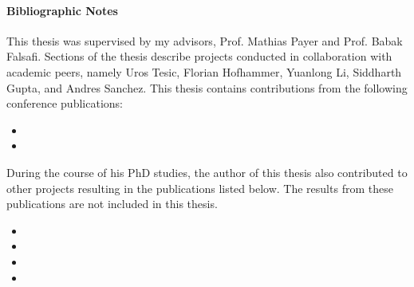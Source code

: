 \paragraph{Bibliographic Notes}
This thesis was supervised by my advisors, Prof. Mathias Payer and Prof. Babak Falsafi.
Sections of the thesis describe projects conducted in collaboration with academic peers, 
namely Uros Tesic, Florian Hofhammer, Yuanlong Li, Siddharth Gupta, and Andres Sanchez.
This thesis contains contributions from the following conference publications:
\begin{itemize}
      \item {}
      \item {}
\end{itemize}

During the course of his PhD studies, the author of this thesis also contributed to
other projects resulting in the publications listed below.
The results from these publications are not included in this thesis.
\begin{itemize}
      \item {}
      \item {}
      \item {}
      \item {}
\end{itemize}